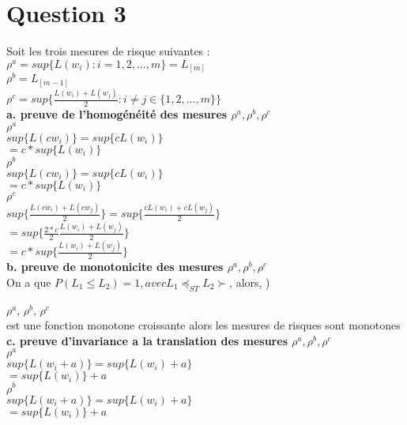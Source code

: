 \section{Question 3}

Soit les trois mesures de risque suivantes :\\
$\rho^a= sup\{L(w_i) : i= 1,2,...,m\} = L_{[m]}$\\
$\rho^b=   L_{[m-1]}$\\
$\rho^c= sup\{\frac{L(w_i)+L(w_j)}{2} : i \neq j \in \{1,2,...,m\}\}$\\


\textbf{a. preuve de l'homogénéité des mesures $\rho^a, \rho^b, \rho^c$}\\
\textbf{$\rho^a$}\\
$sup\{L(cw_i)\} = sup\{cL(w_i)\}$\\
$ = c*sup\{L(w_i)\}$\\

\textbf{$\rho^b$}\\
$sup\{L(cw_i)\} = sup\{cL(w_i)\}$\\
$ = c*sup\{L(w_i)\}$\\

\textbf{$\rho^c$}\\
$sup\{\frac{L(cw_i)+L(cw_j)}{2}\} = sup\{\frac{cL(w_i)+cL(w_j)}{2}\}$\\
$ = sup\{\frac{2*c}{2} \frac{L(w_i)+L(w_j)}{2}\}$\\
$ = c*sup\{ \frac{L(w_i)+L(w_j)}{2}\}$\\

\textbf{b. preuve de monotonicite des mesures $\rho^a, \rho^b, \rho^c$}\\
On a que $P(L_1 \le L_2) = 1, avec L_1 \preceq_{ST} L_2 \succ$, alors, )

\textbf{$\rho^a$}, \textbf{$\rho^b$}, \textbf{$\rho^c$}\\
 est une fonction monotone croissante alors les mesures de risques sont monotones\\

\textbf{c. preuve d'invariance a la translation des mesures $\rho^a, \rho^b, \rho^c$}\\

\textbf{$\rho^a$}\\
$sup\{L(w_i+a)\} = sup\{L(w_i)+a\}$\\
$ = sup\{L(w_i)\} + a$\\

\textbf{$\rho^b$}\\
$sup\{L(w_i+a)\} = sup\{L(w_i)+a\}$\\
$ = sup\{L(w_i)\}+a$\\

